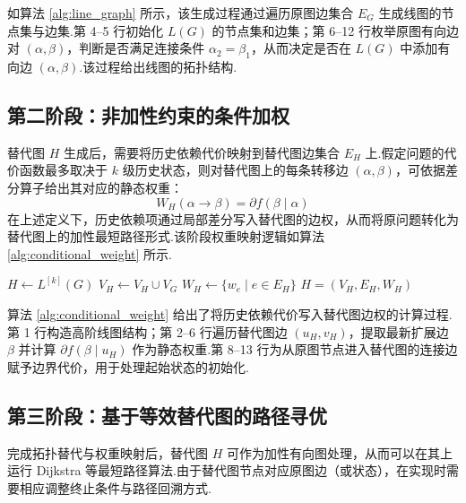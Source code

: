 如算法 \ref{alg:line_graph} 所示，该生成过程通过遍历原图边集合 $E_G$ 生成线图的节点集与边集.第 4--5 行初始化 $L(G)$ 的节点集和边集；第 6--12 行枚举原图有向边对 $(\alpha, \beta)$，判断是否满足连接条件 $\alpha_2=\beta_1$，从而决定是否在 $L(G)$ 中添加有向边 $(\alpha,\beta)$.该过程给出线图的拓扑结构.

\subsection{第二阶段：非加性约束的条件加权}
替代图 $H$ 生成后，需要将历史依赖代价映射到替代图边集合 $E_H$ 上.假定问题的代价函数最多取决于 $k$ 级历史状态，则对替代图上的每条转移边 $(\alpha, \beta)$，可依据差分算子给出其对应的静态权重：
\begin{equation}
    W_H(\alpha \to \beta) = \partial f(\beta \mid \alpha)
\end{equation}
在上述定义下，历史依赖项通过局部差分写入替代图的边权，从而将原问题转化为替代图上的加性最短路径形式.该阶段权重映射逻辑如算法 \ref{alg:conditional_weight} 所示.

\begin{algorithm}[H]
\caption{替代图的条件加权}\label{alg:conditional_weight}
$H \leftarrow L^{[k]}(G) $ 
$V_H \leftarrow V_H \cup V_G$\;
$W_H \leftarrow \{w_e \mid e \in E_H\}$\;
\Return $H = (V_H, E_H, W_H)$\;
\end{algorithm}

算法 \ref{alg:conditional_weight} 给出了将历史依赖代价写入替代图边权的计算过程.第 1 行构造高阶线图结构；第 2--6 行遍历替代图边 $(u_H,v_H)$，提取最新扩展边 $\beta$ 并计算 $\partial f(\beta\mid u_H)$ 作为静态权重.第 8--13 行为从原图节点进入替代图的连接边赋予边界代价，用于处理起始状态的初始化.

\subsection{第三阶段：基于等效替代图的路径寻优}
完成拓扑替代与权重映射后，替代图 $H$ 可作为加性有向图处理，从而可以在其上运行 Dijkstra 等最短路径算法.由于替代图节点对应原图边（或状态），在实现时需要相应调整终止条件与路径回溯方式.

